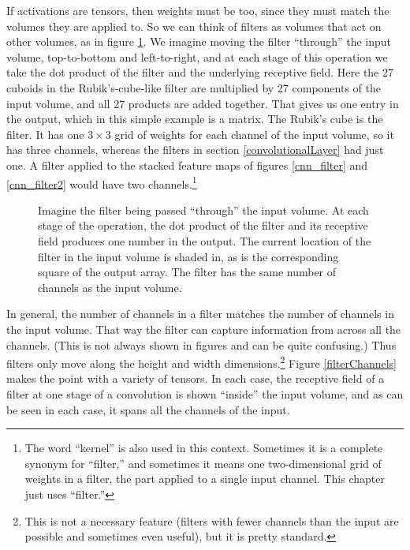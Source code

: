 
If activations are tensors, then weights must be too, since they must match the volumes they are applied to. So we can think of filters as volumes that act on other volumes, as in figure \ref{filterToVolume}. We imagine moving the filter ``through'' the input volume, top-to-bottom and left-to-right, and at each stage of this operation we take the dot product of the filter and the underlying receptive field. Here the 27 cuboids in the Rubik's-cube-like filter are multiplied by 27 components of the input volume, and all 27 products are added together. That gives us one entry in the output, which in this simple example is a matrix. The Rubik's cube is the filter. It has one $3 \times 3$ grid of weights for each channel of the input volume, so it has three channels, whereas the filters in section \ref{convolutionalLayer} had just one. A filter applied to the stacked feature maps of figures \ref{cnn_filter} and \ref{cnn_filter2} would have two channels.\footnote{The word ``kernel'' is also used in this context. Sometimes it is a complete synonym for ``filter,'' and sometimes it means one two-dimensional grid of weights in a filter, the part applied to a single input channel. This chapter just uses ``filter.''}

\begin{figure}
\centering
{}
\caption[Soraya Boza and Jeff Yoshimi.]{Imagine the filter being passed ``through'' the input volume. At each stage of the operation, the dot product of the filter and its receptive field produces one number in the output. The current location of the filter in the input volume is shaded in, as is the corresponding square of the output array. The filter has the same number of channels as the input volume.}
\label{filterToVolume}
\end{figure}

In general, the number of channels in a filter matches the number of channels in the input volume. That way the filter can capture information from across all the channels. (This is not always shown in figures and can be quite confusing.) Thus filters only move along the height and width dimensions.\footnote{This is not a necessary feature (filters with fewer channels than the input are possible and sometimes even useful), but it is pretty standard.} Figure \ref{filterChannels} makes the point with a variety of tensors. In each case, the receptive field of a filter at one stage of a convolution is shown ``inside'' the input volume, and as can be seen in each case, it spans all the channels of the input.

